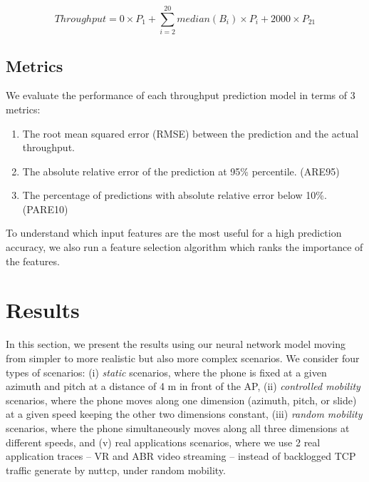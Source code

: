 \documentclass[sigconf,anonymous]{acmart}
\begin{document}
\begin{equation}
Throughput = 0 \times P_{1} + \sum_{i=2}^{20} median(B_{i}) \times P_{i} + 2000 \times P_{21}
\end{equation}


\subsection{Metrics}
We evaluate the performance of each throughput prediction model in terms of 3 metrics:

\begin{enumerate}
    \item The root mean squared error (RMSE) between the prediction and the actual throughput.
    \item The absolute relative error of the prediction at 95\% percentile. (ARE95)
    \item The percentage of predictions with absolute relative error below 10\%. (PARE10)
\end{enumerate}

To understand which input features are the most useful for a high prediction accuracy, we also run a feature selection algorithm which ranks the importance of the features.

\section{Results} %
\label{section: Results}

In this section, we present the results using our neural network model
moving from simpler to more realistic but also more complex
scenarios. We consider four types of scenarios: (i) {\em static} scenarios,
where the phone is fixed at a given azimuth and pitch at a distance of
4 m in front of the AP, (ii) {\em controlled mobility} scenarios, where the
phone moves along one dimension (azimuth, pitch, or slide) at a given
speed keeping the other two dimensions constant, (iii) {\em random mobility}
scenarios, where the phone simultaneously moves along all three
dimensions at different speeds, and (v) real applications scenarios,
where we use 2 real application traces -- VR and ABR video streaming
-- instead of backlogged TCP traffic generate by nuttcp, under random
mobility.
\end{document}

